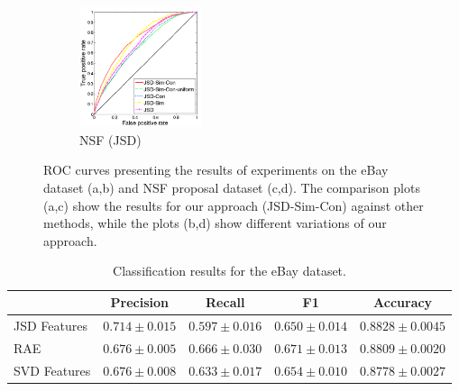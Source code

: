 \documentclass{article} %
\begin{document}
\begin{figure}
        \begin{subfigure}[b]{0.24\textwidth}
        	        \centering
                \includegraphics[width=36mm]{figures/nsf-breakdown-kopia.png}
               \caption{NSF (JSD)}
                \label{fig:nsf-breakdown}
        \end{subfigure}
       \caption{ROC curves presenting the results of experiments on
         the eBay dataset (a,b) and NSF proposal dataset (c,d). The
         comparison plots (a,c) show the results for our approach (JSD-Sim-Con)
         against other methods, while the plots (b,d)
         show different variations of our approach. }\label{fig:roc-curves}
\end{figure}


\begin{table}[t]
\caption{Classification results for the eBay dataset.}
\label{tab:classification-results}
\vspace{-4mm}
\begin{center}
\begin{tabular}{|l|c|c|c|c|}
\hline
&Precision & Recall & F1 & Accuracy
\\ \hline 
JSD Features         &$\mathbf{0.714}\pm 0.015$&$0.597\pm 0.016$&$0.650\pm
0.014$& $\mathbf{0.8828}\pm 0.0045$\\
RAE             &$0.676\pm 0.005$&$\mathbf{0.666}\pm 0.030$&$\mathbf{0.671}\pm
0.013$&$0.8809\pm 0.0020$ \\
SVD Features             &$0.676\pm 0.008$&$0.633\pm 0.017$&$0.654\pm
0.010$&$0.8778\pm 0.0027$\\
\hline
\end{tabular}
\end{center}
\end{table}










\end{document}
